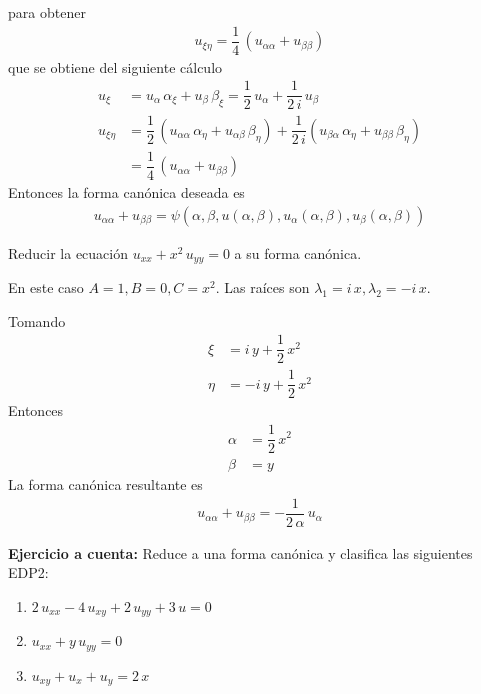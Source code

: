 para obtener
\begin{align}
u_{\xi \eta} = \dfrac{1}{4} \, (u_{\alpha \alpha} + u_{\beta \beta})
\label{eq:ecuacion_02_12}
\end{align}
que se obtiene del siguiente cálculo
\begin{align*}
u_{\xi} &= u_{\alpha} \, \alpha_{\xi} + u_{\beta} \, \beta_{\xi} = \dfrac{1}{2} \, u_{\alpha} + \dfrac{1}{2 \, i} \, u_{\beta} \\
u_{\xi \eta} &= \dfrac{1}{2} \, (u_{\alpha \alpha} \, \alpha_{\eta} + u_{\alpha \beta} \, \beta_{\eta}) + \dfrac{1}{2 \, i} (u_{\beta \alpha} \, \alpha_{\eta} + u_{\beta \beta} \, \beta_{\eta}) \\
&= \dfrac{1}{4} \, (u_{\alpha \alpha} + u_{\beta \beta})
\end{align*}
Entonces la forma canónica deseada es
\begin{align}
u_{\alpha \alpha} + u_{\beta \beta} = \psi( \alpha, \beta, u(\alpha, \beta), u_{\alpha}(\alpha, \beta), u_{\beta}(\alpha, \beta))
\label{eq:ecuacion_02_13}
\end{align}
\begin{ejemplo}{Reducir la ecuación $u_{xx} + x^{2} \, u_{y y} = 0$ a su forma canónica.}

En este caso $A = 1, B = 0, C = x^{2}$. Las raíces son $\lambda_{1} = i \, x, \lambda_{2} = - i \, x$.
\par
Tomando
\begin{align*}
\xi &= i \, y + \dfrac{1}{2} \, x^{2} \\
\eta &= - i \, y + \dfrac{1}{2} \, x^{2}
\end{align*}
Entonces
\begin{align*}
\alpha &= \dfrac{1}{2} \, x^{2} \\
\beta &= y
\end{align*}
La forma canónica resultante es
\begin{align*}
u_{\alpha \alpha} + u_{\beta \beta} = - \dfrac{1}{2 \, \alpha} \, u_{\alpha}
\end{align*}
\end{ejemplo}
\textbf{Ejercicio a cuenta: } Reduce a una forma canónica y clasifica las siguientes EDP2:
\begin{enumerate}[label=(\Alph*)]
\item $2 \, u_{x x} - 4 \, u_{x y} + 2 \, u_{y y} + 3 \, u = 0$
\item $u_{x x} + y\, u_{y y} = 0$
\item $u_{x y} + u_{x} + u_{y} =  2 \, x$
\end{enumerate}
